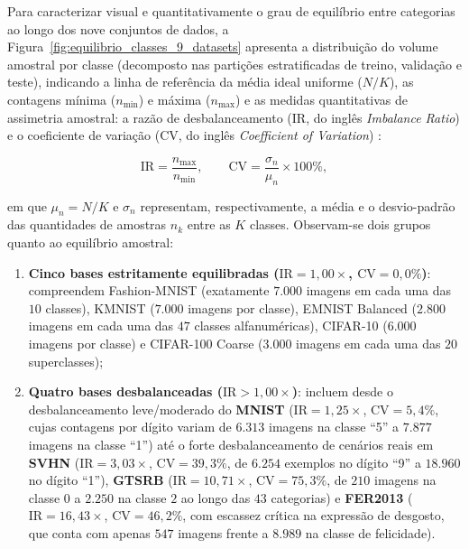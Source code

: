 \documentclass[
    12pt,
    openright,
    oneside,
    a4paper,
    english,
    brazil
]{abntex2}
\begin{document}
Para caracterizar visual e quantitativamente o grau de equilíbrio entre categorias ao longo dos nove conjuntos de dados, a Figura~\ref{fig:equilibrio_classes_9_datasets} apresenta a distribuição do volume amostral por classe (decomposto nas partições estratificadas de treino, validação e teste), indicando a linha de referência da média ideal uniforme (\(N/K\)), as contagens mínima (\(n_{\min}\)) e máxima (\(n_{\max}\)) e as medidas quantitativas de assimetria amostral: a razão de desbalanceamento (IR, do inglês \textit{Imbalance Ratio}) e o coeficiente de variação (CV, do inglês \textit{Coefficient of Variation}) \cite{johnson2019survey,deisenroth2020mathematics}:

\begin{equation}
\label{eq:ir_cv}
\text{IR} = \frac{n_{\max}}{n_{\min}},
\qquad
\text{CV} = \frac{\sigma_n}{\mu_n} \times 100\%,
\end{equation}

em que \(\mu_n = N/K\) e \(\sigma_n\) representam, respectivamente, a média e o desvio-padrão das quantidades de amostras \(n_k\) entre as \(K\) classes. Observam-se dois grupos quanto ao equilíbrio amostral:
\begin{enumerate}
    \item \textbf{Cinco bases estritamente equilibradas (\(\text{IR} = 1{,}00\times\), \(\text{CV} = 0{,}0\%\))}: compreendem Fashion-MNIST (exatamente \(7.000\) imagens em cada uma das \(10\) classes), KMNIST (\(7.000\) imagens por classe), EMNIST Balanced (\(2.800\) imagens em cada uma das \(47\) classes alfanuméricas), CIFAR-10 (\(6.000\) imagens por classe) e CIFAR-100 Coarse (\(3.000\) imagens em cada uma das \(20\) superclasses);
    \item \textbf{Quatro bases desbalanceadas (\(\text{IR} > 1{,}00\times\))}: incluem desde o desbalanceamento leve/moderado do \textbf{MNIST} (\(\text{IR} = 1{,}25\times\), \(\text{CV} = 5{,}4\%\), cujas contagens por dígito variam de \(6.313\) imagens na classe ``5'' a \(7.877\) imagens na classe ``1'') até o forte desbalanceamento de cenários reais em \textbf{SVHN} (\(\text{IR} = 3{,}03\times\), \(\text{CV} = 39{,}3\%\), de \(6.254\) exemplos no dígito ``9'' a \(18.960\) no dígito ``1''), \textbf{GTSRB} (\(\text{IR} = 10{,}71\times\), \(\text{CV} = 75{,}3\%\), de \(210\) imagens na classe \(0\) a \(2.250\) na classe \(2\) ao longo das \(43\) categorias) e \textbf{FER2013} (\(\text{IR} = 16{,}43\times\), \(\text{CV} = 46{,}2\%\), com escassez crítica na expressão de desgosto, que conta com apenas \(547\) imagens frente a \(8.989\) na classe de felicidade).
\end{enumerate}
\end{document}

